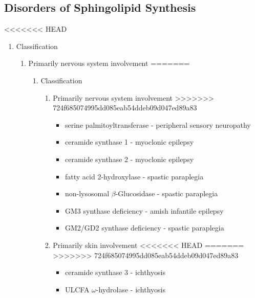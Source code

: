 \documentclass[fontsize=12pt]{scrartcl}
\begin{document}
\begin{enumerate}
\begin{enumerate}
\subsection{Disorders of Sphingolipid Synthesis}
<<<<<<< HEAD
\label{sec:orgc1c0d2e}
\begin{enumerate}
\item Classification
\label{sec:orgae95d59}
\begin{enumerate}
\item Primarily nervous system involvement
\label{sec:orgf0497ab}
=======
\label{sec:orgeb4cc11}
\begin{enumerate}
\item Classification
\label{sec:org9ccd15a}
\begin{enumerate}
\item Primarily nervous system involvement
\label{sec:orgd16581a}
>>>>>>> 724f685074995dd085eab54ddeb09d047ed89a83
\begin{itemize}
\item serine palmitoyltransferase - peripheral sensory neuropathy
\item ceramide synthase 1 - myoclonic epilepsy
\item ceramide synthase 2 - myoclonic epilepsy
\item fatty acid 2-hydroxylase - spastic paraplegia
\item non-lysosomal \(\beta\)-Glucosidase - spastic paraplegia
\item GM3 synthase deficiency - amish infantile epilepsy
\item GM2/GD2 synthase deficiency - spastic paraplegia
\end{itemize}

\item Primarily skin involvement
<<<<<<< HEAD
\label{sec:org257a17c}
=======
\label{sec:orgaae99f7}
>>>>>>> 724f685074995dd085eab54ddeb09d047ed89a83
\begin{itemize}
\item ceramide synthase 3 - ichthyosis
\item ULCFA \(\omega\)-hydrolase - ichthyosis
\end{itemize}
\end{enumerate}


\end{enumerate}
\end{enumerate}
\end{enumerate}
\end{enumerate}
\end{enumerate}
\end{document}
